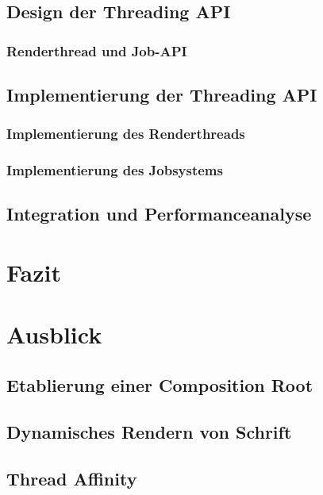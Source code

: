 \documentclass[12pt,a4paper,listof=totocnumbered,parskip=half,numbers=noendperiod]{scrreprt}
\begin{document}
\section{Design der Threading API}

\subsection{Renderthread und Job-API}


\section{Implementierung der Threading API}

\subsection{Implementierung des Renderthreads}



\subsection{Implementierung des Jobsystems}


\section{Integration und Performanceanalyse}

\chapter{Fazit}
\chapter{Ausblick}
\section{Etablierung einer Composition Root}

\section{Dynamisches Rendern von Schrift}
\section{Thread Affinity}
\end{document}
